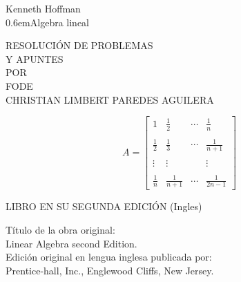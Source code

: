 \begin{titlingpage}

\newcommand\nbvspace[1][3]{\vspace*{\stretch{#1}}}
\newcommand\nbstretchyspace{\spaceskip0.5em plus 0.25em minus 0.25em}
\newcommand{\nbtitlestretch}{\spaceskip0.6em}
\pagestyle{empty}

\begin{center}
\bfseries
\nbvspace[1]

\Large Kenneth Hoffman\\
\Huge
{\nbtitlestretch\Huge Algebra lineal}\\
\vspace{.5cm}
\large
\nbvspace[1]

RESOLUCIÓN DE PROBLEMAS\\
Y APUNTES\\

\nbvspace[1]
\small POR\\
\Large FODE\\[0.5em]
\footnotesize CHRISTIAN LIMBERT PAREDES AGUILERA\\

\nbvspace[2]

    $$
    A=
    \left[
	\begin{array}{rrrr}
	    1 & \frac{1}{2} & \cdots & \frac{1}{n}\\\\
	    \frac{1}{2} & \frac{1}{3} & \cdots & \frac{1}{n+1}\\\\
	    \vdots & \vdots && \vdots\\\\
	    \frac{1}{n} & \frac{1}{n+1} & \cdots & \frac{1}{2n-1}
	\end{array}
    \right]
    $$

\nbvspace[3]
\normalsize

LIBRO EN SU SEGUNDA EDICIÓN (Ingles)\\
\large
\nbvspace[1]

\end{center}

\break
\bfseries 

\nbvspace[1]
Título de la obra original:\\
Linear Algebra second Edition.\\
Edición original en lengua inglesa publicada por:\\
Prentice-hall, Inc., Englewood Cliffs, New Jersey.\\


\end{titlingpage}
